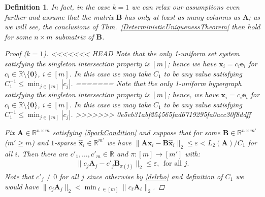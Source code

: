 \documentclass[9pt,twocolumn]{pnas-new}
\newtheorem{definition}{Definition}
\begin{document}
\begin{definition}
In fact, in the case $k=1$ we can relax our assumptions even further and assume that the matrix $\mathbf{B}$ has only at least as many columns as $\mathbf{A}$; as we will see, the conclusions of Thm.~\ref{DeterministicUniquenessTheorem} then hold for some $n \times m$ submatrix of $\mathbf{B}$.

\begin{proof}[Proof ($k=1$)]
<<<<<<< HEAD
Note that the only 1-uniform set system satisfying the singleton intersection property is $[m]$; hence we have $\mathbf{x}_i = c_i \mathbf{e}_i$ for $c_i \in \mathbb{R} \setminus \{\mathbf{0}\}$, $i \in [m]$. In this case we may take $C_1$ to be any value satisfying $C_1^{-1} \leq \min_{j \in [m]} |c_{j}|$. 
=======
Note that the only 1-uniform hypergraph satisfying the singleton intersection property is $[m]$; hence, we have $\mathbf{x}_i = c_i \mathbf{e}_i$ for $c_i \in \mathbb{R} \setminus \{\mathbf{0}\}$, $i \in [m]$. In this case we may take $C_1$ to be any value satisfying $C_1^{-1} \leq \min_{j \in [m]} |c_{j}|$. 
>>>>>>> 0e5eb31abf254565fad6719295fa0acc30f8ddff

Fix $\mathbf{A} \in \mathbb{R}^{n \times m}$ satisfying \eqref{SparkCondition} and suppose that for some $\mathbf{B} \in \mathbb{R}^{n \times m'}$ ($m' \geq m$) and $1$-sparse $\mathbf{\hat x}_i \in \mathbb{R}^{m'}$ we have  $\|\mathbf{A}\mathbf{x}_i - \mathbf{B}\mathbf{\hat x}_i\|_2 \leq \varepsilon < L_2(\mathbf{A}) / C_1$ for all $i$. Then there are $c'_1, \ldots, c'_m \in \mathbb{R}$ and $\pi: [m] \to [m']$ with:
\begin{align}\label{1D}
\|c_j\mathbf{A}_j - c'_j\mathbf{B}_{\pi(j)}\|_2 \leq \varepsilon, \ \ \text{for all $j$}.
\end{align} 
Note that $c'_j \neq 0$ for all $j$ since otherwise by \eqref{delrho} and definition of $C_1$ we would have $\|c_j\mathbf{A}_j\|_2 < \min_{\ell \in [m]}\|c_{\ell}\mathbf{A}_{\ell}\|_2$. 


\end{proof}
\end{definition}
\end{document}
